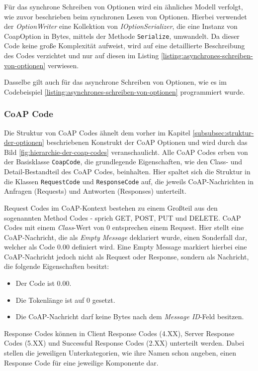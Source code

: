 Für das synchrone Schreiben von Optionen wird ein ähnliches Modell verfolgt, wie zuvor beschrieben beim synchronen Lesen von Optionen. Hierbei verwendet der \textit{OptionWriter} eine Kollektion von \textit{IOptionSerializer}, die eine Instanz von CoapOption in Bytes, mittels der Methode \texttt{Serialize}, umwandelt. Da dieser Code keine große Komplexität aufweist, wird auf eine detaillierte Beschreibung des Codes verzichtet und nur auf diesen im Listing \ref{listing:asynchrones-schreiben-von-optionen} verwiesen.

Dasselbe gilt auch für das asynchrone Schreiben von Optionen, wie es im Codebeispiel \ref{listing:asynchrones-schreiben-von-optionen} programmiert wurde.

\subsubsection{CoAP Code}
\label{subsubsec:coap-code}

Die Struktur von CoAP Codes ähnelt dem vorher im Kapitel \ref{subsubsec:struktur-der-optionen} beschriebenen Konstrukt der CoAP Optionen und wird durch das Bild \ref{fig:hierarchie-der-coap-codes} veranschaulicht. Alle CoAP Codes erben von der Basisklasse \texttt{CoapCode}, die grundlegende Eigenschaften, wie den Class- und Detail-Bestandteil des CoAP Codes, beinhalten. Hier spaltet sich die Struktur in die Klassen \texttt{RequestCode} und \texttt{ResponseCode} auf, die jeweils CoAP-Nachrichten in Anfragen (Requests) und Antworten (Responses) unterteilt.

Request Codes im CoAP-Kontext bestehen zu einem Großteil aus den sogenannten Method Codes - sprich GET, POST, PUT und DELETE. CoAP Codes mit einem \textit{Class}-Wert von 0 entsprechen einem Request. Hier stellt eine CoAP-Nachricht, die als \textit{Empty Message} deklariert wurde, einen Sonderfall dar, welcher als Code 0.00 definiert wird. Eine Empty Message markiert hierbei eine CoAP-Nachricht jedoch nicht als Request oder Response, sondern als Nachricht, die folgende Eigenschaften besitzt:
\begin{itemize}
    \item Der Code ist 0.00.
    \item Die Tokenlänge ist auf 0 gesetzt.
    \item Die CoAP-Nachricht darf keine Bytes nach dem \textit{Message ID}-Feld besitzen. 
\end{itemize}

Response Codes können in Client Response Codes (4.XX), Server Response Codes (5.XX) und Successful Response Codes (2.XX) unterteilt werden. Dabei stellen die jeweiligen Unterkategorien, wie ihre Namen schon angeben, einen Response Code für eine jeweilige Komponente dar.

